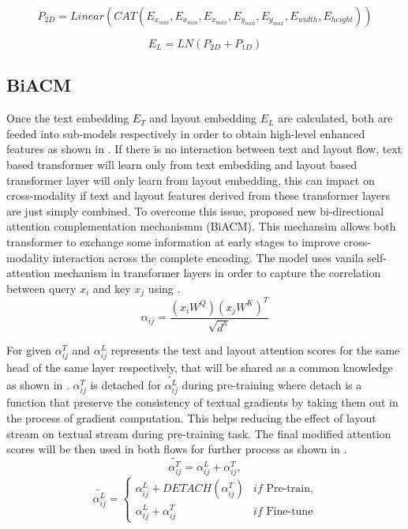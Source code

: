 \begin{equation}
    \label{eq:Linear_Layer}
    P_{2D} = Linear(CAT(E_{x_{min}}, E_{x_{min}}, E_{x_{max}}, E_{y_{min}}, E_{y_{max}}, E_{width}, E_{height}))
\end{equation}

\begin{equation}
    \label{eq:layout_embedding}
    E_L = LN(P_{2D} + P_{1D})
\end{equation}




\subsection{BiACM}

Once the text embedding $E_T$ and layout embedding $E_L$ are calculated, both are feeded into sub-models respectively in order to obtain high-level enhanced features as shown in . If there is no interaction between text and layout flow, text based transformer will learn only from text embedding and layout based transformer layer will only learn from layout embedding, this can impact on cross-modality if text and layout features derived from these transformer layers are just simply combined. To overcome this issue, \cite{wang-etal-2022-lilt} proposed new bi-directional attention complementation mechanismm (BiACM). This mechansim allows both transformer to exchange some information at early stages to improve cross-modality interaction across the complete encoding. The model uses vanila self-attention mechanism in transformer layers in order to capture the correlation between query $x_i$ and key $x_j$ using .  
\begin{equation}
    \alpha_{ij} =  \frac{(x_iW^Q)(x_jW^K)^T}{\sqrt{d^h}}
    \label{eq:vanila_mechanism}
\end{equation}

For given $\alpha_{ij}^T$ and $\alpha_{ij}^L$ represents the text and layout attention scores for the same head of the same layer respectively, that will be shared as a common knowledge  as shown in . $\alpha_{ij}^T$ is detached for $\widetilde{\alpha_{ij}^L}$ during pre-training where detach is a function that preserve the consistency of textual gradients by taking them out in the process of gradient computation. This helps reducing the effect of layout stream on textual stream during pre-training task. The final modified attention scores will be then used in both flows for further process as shown in . 
\begin{equation}
    \widetilde{\alpha_{ij}^T} = \alpha_{ij}^L + \alpha_{ij}^T,
    \label{eq:BiACM}
\end{equation}
\[ \widetilde{\alpha_{ij}^L} = \left\{\begin{matrix}
 \alpha_{ij}^L + DETACH(\alpha_{ij}^T)&if\text{ Pre-train,}\\ 
 \alpha_{ij}^L + \alpha_{ij}^T&  if\text{ Fine-tune}
\end{matrix}\right.\]




